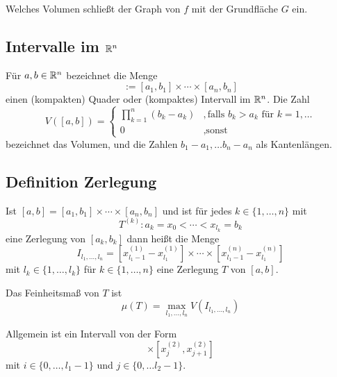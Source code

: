 Welches Volumen schließt der Graph von $f$ mit der Grundfläche $G$ ein.

\subsection{Intervalle im $\mathbb{R}^n$}
Für $a,b \in \mathbb{R}^n$ bezeichnet die Menge
\begin{equation*}
    [a,b] := [a_1, b_1] \times \cdots \times [a_n, b_n]
\end{equation*}
einen (kompakten) Quader oder (kompaktes) Intervall im $\mathbb{R}^n$. Die Zahl
\begin{equation*}
    V([a,b]) =
    \begin{cases}
        \prod_{k=1}^n (b_k - a_k) &, \text{falls }  b_k > a_k \text{ für } k=1,\ldots\\
        0 &,\text{sonst}
    \end{cases}
\end{equation*}
bezeichnet das Volumen, und die Zahlen $b_1 - a_1, \ldots b_n - a_n$ als
Kantenlängen.

\subsection{Definition Zerlegung}
Ist $[a,b] = [a_1, b_1] \times \cdots \times [a_n, b_n]$ und ist für jedes
$k \in \{1, \ldots, n\}$ mit
\begin{equation*}
    T^{(k)} : a_k = x_0 < \cdots < x_{l_k} = b_k
\end{equation*}
eine Zerlegung von $[a_k, b_k]$ dann heißt die Menge
\begin{equation*}
    I_{l_1, \ldots, l_n} = [x_{l_1 - 1}^{(1)} - x_{l_1}^{(1)}] \times \cdots \times
    [x_{l_1 - 1}^{(n)} - x_{l_1}^{(n)}]
\end{equation*}
mit $l_k \in \{1, \ldots, l_k\}$ für $k \in \{1, \ldots, n\}$ eine Zerlegung $T$
von $[a,b]$.

Das Feinheitsmaß von $T$ ist
\begin{equation*}
    \mu(T) = \max_{l_1, \ldots, l_n} V(I_{l_1, \ldots, l_n})
\end{equation*}

Allgemein ist ein Intervall von der Form
\begin{equation*}
    [x_i^{(1)}, x_{i+1}^{(1)}] \times [x_j^{(2)}, x_{j+1}^{(2)}]
\end{equation*}
mit $i \in \{0, \ldots, l_1-1\}$ und $j \in \{0, \ldots l_2-1\}$.

